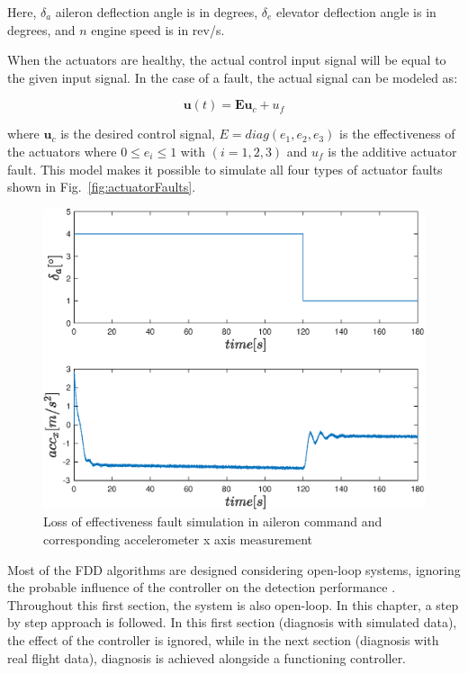 Here, $ \delta_{a}$ aileron deflection angle is in degrees, $ \delta_{e}$ elevator deflection angle is in degrees, and $n$ engine speed is in rev/s. 

When the actuators are healthy, the actual control input signal will be equal to the given input signal. In the case of a fault, the actual signal can be modeled as:

\begin{equation}
\bm{u}\left(t\right)= \bm{E}\bm{u}_c + u_f
\end{equation}

where $\bm{u}_c $ is the desired control signal, $E = diag(e_1, e_2, e_3)$ is the effectiveness of the actuators where $0 \leq e_i \leq 1 $ with $(i = 1, 2 ,3)$ and $u_f$ is the additive actuator fault. 
This model makes it possible to simulate all four types of actuator faults shown in Fig.~\ref{fig:actuatorFaults}.

\begin{figure}
\begin{center}
\includegraphics[width=12cm]{figures/control_input_acc_x}    %
\caption{Loss of effectiveness fault simulation in aileron command and corresponding accelerometer x axis measurement} 
\label{fig:faultSimulation}
\end{center}
\end{figure}

Most of the FDD algorithms are designed considering open-loop systems, ignoring the probable influence of the controller on the detection performance \cite{pandita2013closed}. 
Throughout this first section, the system is also open-loop.  
In this chapter, a step by step approach is followed. 
In this first section (diagnosis with simulated data), the effect of the controller is ignored, while in the next section (diagnosis with real flight data), diagnosis is achieved alongside a functioning controller.


